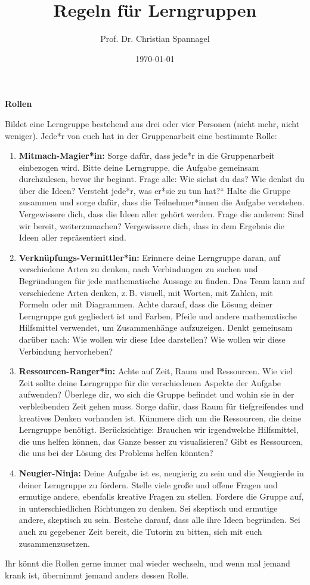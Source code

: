 \documentclass{../cssheet}
\title{Regeln für Lerngruppen}
\author{Prof. Dr. Christian Spannagel}
\date{\today}
\begin{document}
\printtitle


\textbf{Rollen} 

Bildet eine Lerngruppe bestehend aus drei oder vier Personen (nicht mehr, nicht weniger). Jede*r von euch hat in der Gruppenarbeit eine bestimmte Rolle:
\begin{enumerate}
\item \textbf{Mitmach-Magier*in:} Sorge dafür, dass jede*r in die Gruppenarbeit einbezogen wird. Bitte deine Lerngruppe, die Aufgabe gemeinsam durchzulesen, bevor ihr beginnt. Frage alle: \glqq{}Wie siehst du das? Wie denkst du über die Ideen? Versteht jede*r, was er*sie zu tun hat?“\grqq{} Halte die Gruppe zusammen und sorge dafür, dass die Teilnehmer*innen die Aufgabe verstehen. Vergewissere dich, dass die Ideen aller gehört werden. Frage die anderen: \glqq{}Sind wir bereit, weiterzumachen?\grqq{} Vergewissere dich, dass in dem Ergebnis die Ideen aller repräsentiert sind. 
\item \textbf{Verknüpfungs-Vermittler*in:} Erinnere deine Lerngruppe daran, auf verschiedene Arten zu denken, nach Verbindungen zu suchen und Begründungen für jede mathematische Aussage zu finden. Das Team kann auf verschiedene Arten denken, z.\,B. visuell, mit Worten, mit Zahlen, mit Formeln oder mit Diagrammen. Achte darauf, dass die Lösung deiner Lerngruppe  gut gegliedert ist und Farben, Pfeile und andere mathematische Hilfsmittel verwendet, um Zusammenhänge aufzuzeigen. Denkt gemeinsam darüber nach: \glqq{}Wie wollen wir diese Idee darstellen? Wie wollen wir diese Verbindung hervorheben?\grqq{}
\item  \textbf{Ressourcen-Ranger*in:} Achte auf Zeit, Raum und Ressourcen. Wie viel Zeit sollte deine Lerngruppe für die verschiedenen Aspekte der Aufgabe aufwenden? Überlege dir, wo sich die Gruppe befindet und wohin sie in der verbleibenden Zeit gehen muss. Sorge dafür, dass Raum für tiefgreifendes und kreatives Denken vorhanden ist. Kümmere dich um die Ressourcen, die deine Lerngruppe benötigt. Berücksichtige: \glqq{}Brauchen wir irgendwelche Hilfsmittel, die uns helfen können, das Ganze besser zu visualisieren? Gibt es Ressourcen, die uns bei der Lösung des Problems helfen könnten?\grqq{}
\item \textbf{Neugier-Ninja:} Deine Aufgabe ist es, neugierig zu sein und die Neugierde in deiner Lerngruppe zu fördern. Stelle viele große und offene Fragen und ermutige andere, ebenfalls kreative Fragen zu stellen. Fordere die Gruppe auf, in unterschiedlichen Richtungen zu denken. Sei skeptisch und ermutige andere, skeptisch zu sein. Bestehe darauf, dass alle ihre Ideen begründen. Sei auch zu gegebener Zeit bereit, die Tutorin zu bitten, sich mit euch zusammenzusetzen.
\end{enumerate}
Ihr könnt die Rollen gerne immer mal wieder wechseln, und wenn mal jemand krank ist, übernimmt jemand anders dessen Rolle.
\end{document}
